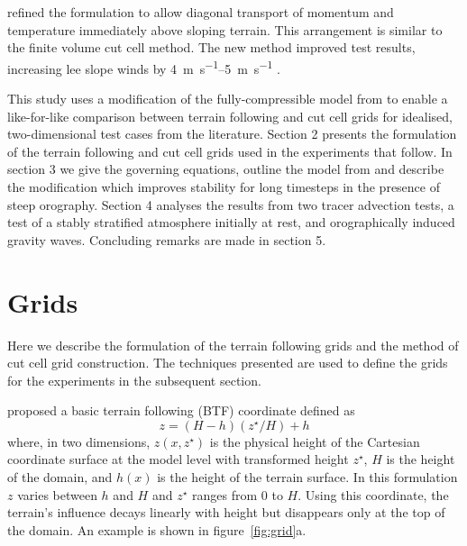 \documentclass[draft]{ametsoc}
\begin{document}
\citet{mesinger2012} refined the formulation to allow diagonal transport of momentum and temperature immediately above sloping terrain.  This arrangement is similar to the finite volume cut cell method.  The new method improved test results, increasing lee slope winds by \SIrange{4}{5}{\meter\per\second} \citep{mesinger2012}.

This study uses a modification of the fully-compressible model from \citet{weller-shahrokhi2014} to enable a like-for-like comparison between terrain following and cut cell grids for idealised, two-dimensional test cases from the literature.  Section 2 presents the formulation of the terrain following and cut cell grids used in the experiments that follow.  In section 3 we give the governing equations, outline the model from \citet{weller-shahrokhi2014} and describe the modification which improves stability for long timesteps in the presence of steep orography.  Section 4 analyses the results from two tracer advection tests, a test of a stably stratified atmosphere initially at rest, and orographically induced gravity waves.  Concluding remarks are made in section 5.


\section{Grids}
\label{sec:grid}

Here we describe the formulation of the terrain following grids and the method of cut cell grid construction.  The techniques presented are used to define the grids for the experiments in the subsequent section.

\citet{galchen-somerville1975} proposed a basic terrain following (BTF) coordinate defined as 
\begin{equation}
	z = \left( H - h \right) \left( z^\star / H \right) + h \label{eqn:btf}
\end{equation}
where, in two dimensions, \(z(x, z^\star)\) is the physical height of the Cartesian coordinate surface at the model level with transformed height \(z^\star\), \(H\) is the height of the domain, and \(h(x)\) is the height of the terrain surface.  In this formulation $z$ varies between $h$ and $H$ and $z^\star$ ranges from 0 to $H$.  Using this coordinate, the terrain's influence decays linearly with height but disappears only at the top of the domain.  An example is shown in figure~\ref{fig:grid}a.
\end{document}
